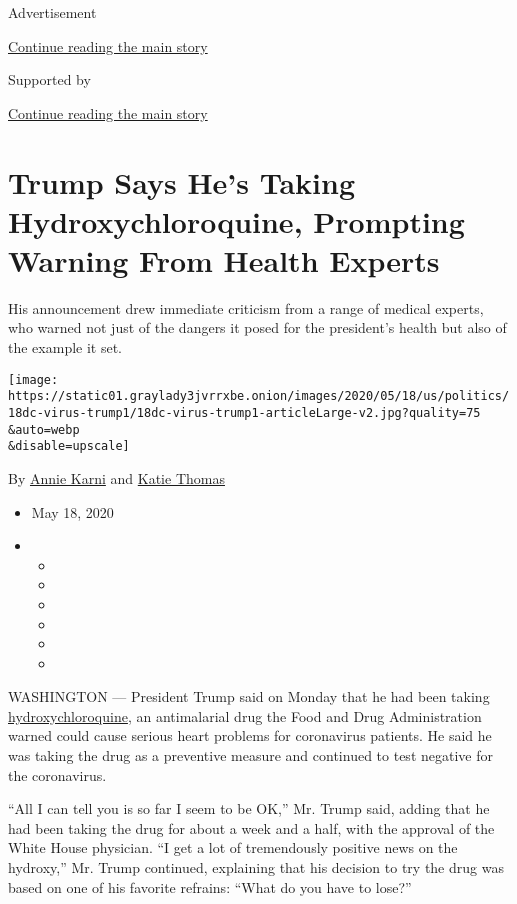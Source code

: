 Advertisement

\protect\hyperlink{after-top}{Continue reading the main story}

Supported by

\protect\hyperlink{after-sponsor}{Continue reading the main story}

\hypertarget{trump-says-hes-taking-hydroxychloroquine-prompting-warning-from-health-experts}{%
\section{Trump Says He's Taking Hydroxychloroquine, Prompting Warning
From Health
Experts}\label{trump-says-hes-taking-hydroxychloroquine-prompting-warning-from-health-experts}}

His announcement drew immediate criticism from a range of medical
experts, who warned not just of the dangers it posed for the president's
health but also of the example it set.

\texttt{[image: https://static01.graylady3jvrrxbe.onion/images/2020/05/18/us/politics/18dc-virus-trump1/18dc-virus-trump1-articleLarge-v2.jpg?quality=75\\\&auto=webp\\\&disable=upscale]}

By \href{https://www.nytimes3xbfgragh.onion/by/annie-karni}{Annie Karni}
and \href{https://www.nytimes3xbfgragh.onion/by/katie-thomas}{Katie
Thomas}

\begin{itemize}
\item
  May 18, 2020
\item
  \begin{itemize}
  \item
  \item
  \item
  \item
  \item
  \item
  \end{itemize}
\end{itemize}

WASHINGTON --- President Trump said on Monday that he had been taking
\href{https://www.nytimes3xbfgragh.onion/article/hydroxychloroquine-coronavirus.html}{hydroxychloroquine},
an antimalarial drug the Food and Drug Administration warned could cause
serious heart problems for coronavirus patients. He said he was taking
the drug as a preventive measure and continued to test negative for the
coronavirus.

``All I can tell you is so far I seem to be OK,'' Mr. Trump said, adding
that he had been taking the drug for about a week and a half, with the
approval of the White House physician. ``I get a lot of tremendously
positive news on the hydroxy,'' Mr. Trump continued, explaining that his
decision to try the drug was based on one of his favorite refrains:
``What do you have to lose?''

